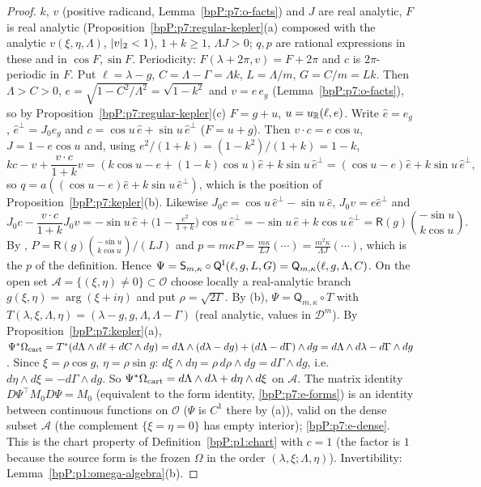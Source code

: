 \begin{proof}
\label{stepP:p7:po-an} $k$, $v$ (positive radicand, Lemma~\ref{bpP:p7:o-facts}) and $J$ are real analytic, $F$ is real analytic (Proposition~\ref{bpP:p7:regular-kepler}(a) composed with the analytic $v(\xi,\eta,\Lambda)$, $\lvert v\rvert_2<1$), $1+k\ge1$, $\Lambda J>0$; $q,p$ are rational expressions in these and in $\cos F,\sin F$. Periodicity: $F(\lambda+2\pi,v)=F+2\pi$ and $c$ is $2\pi$-periodic in $F$.
\label{stepP:p7:po-del} Put $\ell=\lambda-g$, $C=\Lambda-\Gamma=\Lambda k$, $L=\Lambda/m$, $G=C/m=Lk$. Then $\Lambda>C>0$, $e=\sqrt{1-C^2/\Lambda^2}=\sqrt{1-k^2}$ and $v=e\,e_g$ (Lemma~\ref{bpP:p7:o-facts}), so by Proposition~\ref{bpP:p7:regular-kepler}(c) $F=g+u$, $u=u_{\mathbb{R}}(\ell,e)$. Write $\hat e=e_g$, $\hat e^\perp=J_0e_g$ and $c=\cos u\,\hat e+\sin u\,\hat e^\perp$ ($F=u+g$). Then $v\cdot c=e\cos u$, $J=1-e\cos u$ and, using $e^2/(1+k)=(1-k^2)/(1+k)=1-k$,
\[kc-v+\frac{v\cdot c}{1+k}v=(k\cos u-e+(1-k)\cos u)\hat e+k\sin u\,\hat e^\perp=(\cos u-e)\hat e+k\sin u\,\hat e^\perp,\]
so $q=a((\cos u-e)\hat e+k\sin u\,\hat e^\perp)$, which is the position of Proposition~\ref{bpP:p7:kepler}(b). Likewise $J_0c=\cos u\,\hat e^\perp-\sin u\,\hat e$, $J_0v=e\hat e^\perp$ and
\[J_0c-\frac{v\cdot c}{1+k}J_0v=-\sin u\,\hat e+\bigl(1-\tfrac{e^2}{1+k}\bigr)\cos u\,\hat e^\perp=-\sin u\,\hat e+k\cos u\,\hat e^\perp=\mathsf R(g)\binom{-\sin u}{k\cos u}.\]
By , $P=\mathsf R(g)\binom{-\sin u}{k\cos u}/(LJ)$ and $p=m\kappa P=\frac{m\kappa}{LJ}(\cdots)=\frac{m^2\kappa}{\Lambda J}(\cdots)$, which is the $p$ of the definition. Hence $\Psi=\mathsf S_{m,\kappa}\circ\mathsf Q^{\rm I}(\ell,g,L,G)=\mathsf Q_{m,\kappa}(\ell,g,\Lambda,C)$.
\label{stepP:p7:po-symp} On the open set $\mathcal A=\{(\xi,\eta)\ne0\}\subset\mathcal O$ choose locally a real-analytic branch $g(\xi,\eta)=\arg(\xi+i\eta)$ and put $\rho=\sqrt{2\Gamma}$. By (b), $\Psi=\mathsf Q_{m,\kappa}\circ T$ with $T(\lambda,\xi,\Lambda,\eta)=(\lambda-g,g,\Lambda,\Lambda-\Gamma)$ (real analytic, values in $\mathcal D^m$). By Proposition~\ref{bpP:p7:kepler}(a), $\Psi^*\Omega_{\rm cart}=T^*(d\Lambda\wedge d\ell+dC\wedge dg)=d\Lambda\wedge(d\lambda-dg)+(d\Lambda-d\Gamma)\wedge dg=d\Lambda\wedge d\lambda-d\Gamma\wedge dg$. Since $\xi=\rho\cos g$, $\eta=\rho\sin g$: $d\xi\wedge d\eta=\rho\,d\rho\wedge dg=d\Gamma\wedge dg$, i.e.\ $d\eta\wedge d\xi=-d\Gamma\wedge dg$. So $\Psi^*\Omega_{\rm cart}=d\Lambda\wedge d\lambda+d\eta\wedge d\xi$ on $\mathcal A$.
\label{stepP:p7:po-dense} The matrix identity $D\Psi^{\top}M_0D\Psi=M_0$ (equivalent to the form identity, \ref{bpP:p7:e-forms}) is an identity between continuous functions on $\mathcal O$ ($\Psi$ is $C^1$ there by (a)), valid on the dense subset $\mathcal A$ (the complement $\{\xi=\eta=0\}$ has empty interior); \ref{bpP:p7:e-dense}. This is the chart property of Definition~\ref{bpP:p1:chart} with $c=1$ (the factor is $1$ because the source form is the frozen $\Omega$ in the order $(\lambda,\xi;\Lambda,\eta)$). Invertibility: Lemma~\ref{bpP:p1:omega-algebra}(b).

\end{proof}
